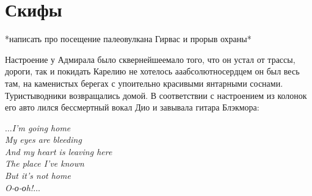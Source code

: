 \chapter{Скифы}
\vepsianrose

*написать про посещение палеовулкана Гирвас и прорыв охраны*

Настроение у Адмирала было сквернейшее\mdash мало того, что он устал от трассы, дороги, так и покидать Карелию не хотелось а\sdash а\sdash абсолютно\mdash сердцем он был весь там, на каменистых берегах с упоительно красивыми янтарными соснами. Туристы\sdash водники возвращались домой. В соответствии с настроением из колонок его авто лился бессмертный вокал Дио и завывала гитара Блэкмора:

\vspace{0.3cm}
\noindent\textit{%
	\hspace*{3.4cm}$\ldots$I'm going home\\
	\hspace*{3.4cm}My eyes are bleeding\\
	\hspace*{3.4cm}And my heart is leaving here\\
	\hspace*{3.4cm}The place I've known\\
	\hspace*{3.4cm}But it's not home\\
	\hspace*{3.4cm}O-о-оh!$\ldots$\\		
}
\vspace{0.3cm} 

\begin{center}
\end{center}
